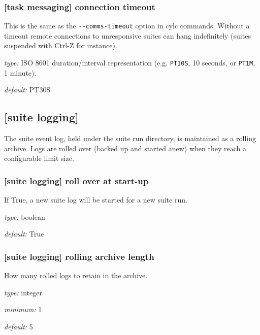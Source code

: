 \subsubsection[connection timeout]{[task messaging] \textrightarrow connection timeout}

This is the same as the \lstinline=--comms-timeout= option in cylc
commands. Without a timeout remote connections to unresponsive
suites can hang indefinitely (suites suspended with Ctrl-Z for instance).

\begin{myitemize}
\item {\em type:} ISO 8601 duration/interval representation (e.g.
\lstinline=PT10S=, 10 seconds, or \lstinline=PT1M=, 1 minute).
\item {\em default:} PT30S
\end{myitemize}

\subsection{[suite logging]}

The suite event log, held under the suite run directory, is maintained
as a rolling archive. Logs are rolled over (backed up and started anew)
when they reach a configurable limit size.

\subsubsection[roll over at start-up]{[suite logging] \textrightarrow roll over at start-up}

If True, a new suite log will be started for a new suite run.

\begin{myitemize}
\item {\em type:} boolean
\item {\em default:} True
\end{myitemize}

\subsubsection[rolling archive length]{[suite logging] \textrightarrow rolling archive length}

How many rolled logs to retain in the archive.

\begin{myitemize}
\item {\em type:} integer
\item {\em minimum:} 1
\item {\em default:} 5
\end{myitemize}

